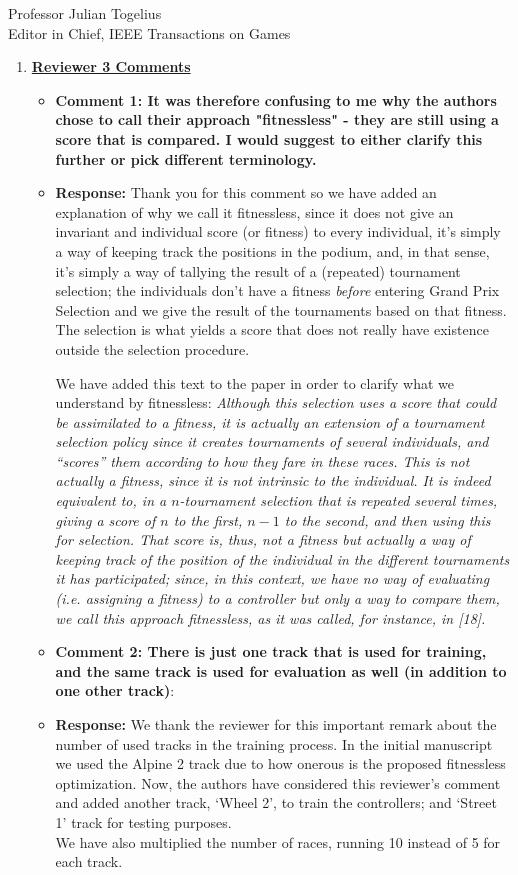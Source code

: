 \documentclass[10pt]{letter} %
\begin{document}
\begin{letter}{Professor Julian Togelius \\ Editor in Chief, IEEE Transactions on Games}
\begin{enumerate}
\item {\bf \underline{ Reviewer 3 Comments}}\\
	\begin{itemize}
	\item {\bf  Comment 1: It was therefore confusing to me why the authors chose to call their approach "fitnessless" - they are still using a score that is compared. I would suggest to either clarify this further or pick different terminology.}
	\item {\bf Response:} 
	Thank you for this comment so we have added an explanation of why we call it fitnessless, since it does not give an invariant and individual score (or fitness) to every
individual, it's simply a way of keeping track the positions in the
podium, and, in that sense, it's simply a way of tallying the result
of a (repeated) tournament selection; the individuals don't have a
fitness {\em before} entering Grand Prix Selection and we give the
result of the tournaments based on that fitness. The selection is what
yields a score that does not really have existence outside the
selection procedure.

We have added this text to the paper in order to clarify what we
understand by fitnessless:
{\em Although this selection uses a score that could be assimilated to a fitness, it is actually an extension of a tournament selection policy since it creates tournaments of several individuals, and ``scores'' them according to how they fare in these races. This is not actually a fitness, since it is not intrinsic to the individual. It is indeed equivalent to, in a $n$-tournament selection that is repeated several times, giving a score of $n$ to the first, $n-1$ to the second, and then using this for selection. That score is, thus, not a fitness but actually a way of keeping track of the position of the individual in the different tournaments it has participated; since, in this context, we have no way of evaluating (i.e. assigning a fitness) to a controller but only a way to compare them, we call this approach {\em fitnessless}, as it was called, for instance, in [18].}\\

		\item {\bf  Comment 2:	There is just one track that is used for training, and the same track is used for evaluation as well (in addition to one other track)}:
		\item {\bf Response:}
		We thank the reviewer for this important remark about the number of used tracks in the training process. In the initial manuscript we used the Alpine 2 track due to how onerous is the proposed fitnessless optimization. 
		Now, the authors have considered this reviewer's comment and added another track, `Wheel 2', to train the controllers; and `Street 1' track for testing purposes.\\
		We have also multiplied the number of races, running 10 instead of 5 for each track.


\end{itemize}
\end{enumerate}
\end{letter}
\end{document}
